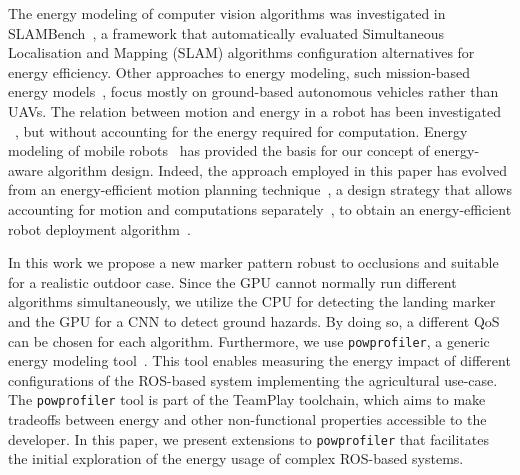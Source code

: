 \documentclass[conference]{IEEEtran}
\newcommand{\stt}[1]{{\small\tt #1}} %
\newcommand{\powprof}{\stt{powprofiler}}
\begin{document}
The energy modeling of computer vision algorithms was investigated in
SLAMBench~\cite{nardi2015introducing}, a framework that automatically evaluated 
Simultaneous Localisation and Mapping (SLAM) algorithms configuration alternatives
for energy efficiency. 
%
Other approaches to energy modeling, such mission-based energy
models~\cite{sadrpour2013experimental, sadrpour2013mission}, 
focus mostly on ground-based autonomous vehicles rather than UAVs. 
The relation between motion and energy in a
robot has been investigated ~\cite{morales2009power}, but without accounting for the energy required for computation.
%
Energy modeling of mobile robots~\cite{mei2006deployment, mei2005case, mei2004energy} has provided
the basis for our concept of %
energy-aware algorithm design. Indeed, the approach employed in this paper has evolved
from an energy-efficient motion planning technique~\cite{mei2004energy}, a design strategy that allows accounting for
motion and computations separately~\cite{mei2005case}, to obtain an
energy-efficient robot deployment algorithm~\cite{mei2006deployment}.
%
%

In this work we propose a new marker pattern robust to occlusions and suitable for a realistic outdoor case. Since the GPU cannot normally run different algorithms simultaneously, we utilize the CPU for detecting the landing marker and the GPU for a CNN to detect ground hazards. By doing so, a different QoS can be chosen for each algorithm. Furthermore, we use \powprof{}, a generic energy
modeling tool~\cite{seewald2019coarse}. This tool enables measuring
the energy impact of different configurations of the ROS-based system
implementing the agricultural use-case.
The \powprof{} tool is part of the TeamPlay toolchain, which aims to make tradeoffs between energy and other non-functional properties accessible to the developer. 
In this paper, we present
extensions to \powprof{} that facilitates the initial exploration of
the energy usage of complex ROS-based systems.
\end{document}

